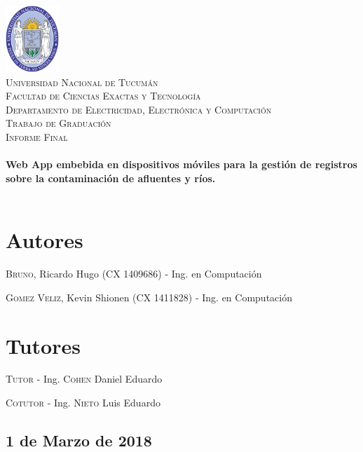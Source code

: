 \begin{titlepage}
 
\begin{center}
 
 
\includegraphics[width=0.15\textwidth]{imagenes/logo-unt.png}\\[0.5cm]
 
\textsc{\LARGE Universidad Nacional de Tucumán}\\[0.5cm]

\textsc{\normalsize Facultad de Ciencias Exactas y Tecnología}\\[0.5cm]

\textsc{\small Departamento de Electricidad, Electrónica y Computación}\\[0.7cm]
 
\textsc{\LARGE Trabajo de Graduación}\\[0.1cm]

\textsc{\normalsize Informe Final}\\[0.1cm]
 
 
\HRule \\[0.4cm]
{ \LARGE \bfseries Web App embebida en dispositivos móviles para la gestión de registros sobre la contaminación de afluentes y ríos.
}\\[0.4cm]
\HRule \\[0.4cm]
 
\end{center} 

\section*{Autores}
\textsc{Bruno}, Ricardo Hugo (CX 1409686) - Ing. en Computación

\textsc{Gomez Veliz}, Kevin Shionen (CX 1411828) - Ing. en Computación

\section*{Tutores}
\textsc{Tutor - } Ing. \textsc{Cohen} Daniel Eduardo

\textsc{Cotutor - } Ing. \textsc{Nieto} Luis Eduardo

\begin{center}
\subsection*{1 de Marzo de 2018}
\end{center}

\end{titlepage}